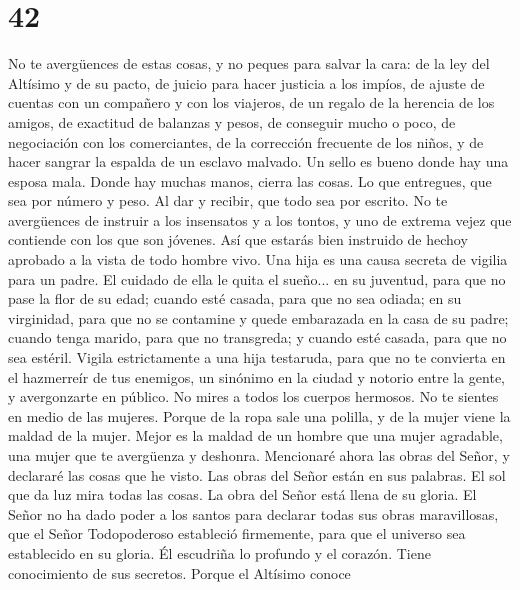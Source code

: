 \hypertarget{section-41}{%
\section{42}\label{section-41}}

 No te avergüences de estas cosas, y no peques para salvar
la cara:  de la ley del Altísimo y de su pacto, de juicio
para hacer justicia a los impíos,  de ajuste de cuentas
con un compañero y con los viajeros, de un regalo de la herencia de los
amigos,  de exactitud de balanzas y pesos, de conseguir
mucho o poco,  de negociación con los comerciantes, de la
corrección frecuente de los niños, y de hacer sangrar la espalda de un
esclavo malvado.  Un sello es bueno donde hay una esposa
mala. Donde hay muchas manos, cierra las cosas.  Lo que
entregues, que sea por número y peso. Al dar y recibir, que todo sea por
escrito.  No te avergüences de instruir a los insensatos y
a los tontos, y uno de extrema vejez que contiende con los que son
jóvenes. Así que estarás bien instruido de hechoy aprobado a la vista de
todo hombre vivo.  Una hija es una causa secreta de
vigilia para un padre. El cuidado de ella le quita el sueño... en su
juventud, para que no pase la flor de su edad; cuando esté casada, para
que no sea odiada;  en su virginidad, para que no se
contamine y quede embarazada en la casa de su padre; cuando tenga
marido, para que no transgreda; y cuando esté casada, para que no sea
estéril.  Vigila estrictamente a una hija testaruda, para
que no te convierta en el hazmerreír de tus enemigos, un sinónimo en la
ciudad y notorio entre la gente, y avergonzarte en público.
 No mires a todos los cuerpos hermosos. No te sientes en
medio de las mujeres.  Porque de la ropa sale una
polilla, y de la mujer viene la maldad de la mujer. 
Mejor es la maldad de un hombre que una mujer agradable, una mujer que
te avergüenza y deshonra.  Mencionaré ahora las obras del
Señor, y declararé las cosas que he visto. Las obras del Señor están en
sus palabras.  El sol que da luz mira todas las cosas. La
obra del Señor está llena de su gloria.  El Señor no ha
dado poder a los santos para declarar todas sus obras maravillosas, que
el Señor Todopoderoso estableció firmemente, para que el universo sea
establecido en su gloria.  Él escudriña lo profundo y el
corazón. Tiene conocimiento de sus secretos. Porque el Altísimo conoce
